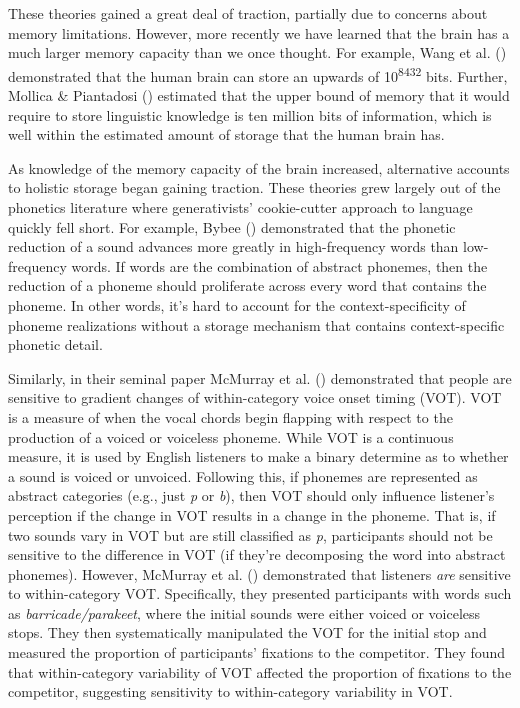 \documentclass[
  12pt,
]{scrartcl}
\begin{document}
These theories gained a great deal of traction, partially due to
concerns about memory limitations. However, more recently we have
learned that the brain has a much larger memory capacity than we once
thought. For example, Wang et al.
() demonstrated
that the human brain can store an upwards of 10\textsuperscript{8432}
bits. Further, Mollica \& Piantadosi
() estimated that
the upper bound of memory that it would require to store linguistic
knowledge is ten million bits of information, which is well within the
estimated amount of storage that the human brain has.

As knowledge of the memory capacity of the brain increased, alternative
accounts to holistic storage began gaining traction. These theories grew
largely out of the phonetics literature where generativists'
cookie-cutter approach to language quickly fell short. For example,
Bybee () demonstrated
that the phonetic reduction of a sound advances more greatly in
high-frequency words than low-frequency words. If words are the
combination of abstract phonemes, then the reduction of a phoneme should
proliferate across every word that contains the phoneme. In other words,
it's hard to account for the context-specificity of phoneme realizations
without a storage mechanism that contains context-specific phonetic
detail.

Similarly, in their seminal paper McMurray et al.
()
demonstrated that people are sensitive to gradient changes of
within-category voice onset timing (VOT). VOT is a measure of when the
vocal chords begin flapping with respect to the production of a voiced
or voiceless phoneme. While VOT is a continuous measure, it is used by
English listeners to make a binary determine as to whether a sound is
voiced or unvoiced. Following this, if phonemes are represented as
abstract categories (e.g., just \emph{p} or \emph{b}), then VOT should
only influence listener's perception if the change in VOT results in a
change in the phoneme. That is, if two sounds vary in VOT but are still
classified as \emph{p}, participants should not be sensitive to the
difference in VOT (if they're decomposing the word into abstract
phonemes). However, McMurray et al.
()
demonstrated that listeners \emph{are} sensitive to within-category VOT.
Specifically, they presented participants with words such as
\emph{barricade/parakeet}, where the initial sounds were either voiced
or voiceless stops. They then systematically manipulated the VOT for the
initial stop and measured the proportion of participants' fixations to
the competitor. They found that within-category variability of VOT
affected the proportion of fixations to the competitor, suggesting
sensitivity to within-category variability in VOT.
\end{document}
